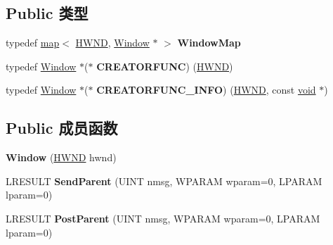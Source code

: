 \subsection*{Public 类型}
\begin{DoxyCompactItemize}
\item 
\mbox{\label{struct_window_a9efa6dd6887b5f902f17591bf0cfce15}} 
typedef \hyperlink{classmap}{map}$<$ \hyperlink{interfacevoid}{H\+W\+ND}, \hyperlink{struct_window}{Window} $\ast$ $>$ {\bfseries Window\+Map}
\item 
\mbox{\label{struct_window_a04b874d3421d316e0fa48deb09ecc94a}} 
typedef \hyperlink{struct_window}{Window} $\ast$($\ast$ {\bfseries C\+R\+E\+A\+T\+O\+R\+F\+U\+NC}) (\hyperlink{interfacevoid}{H\+W\+ND})
\item 
\mbox{\label{struct_window_aa203164dfe6dbac6e3d54d9ffe846a48}} 
typedef \hyperlink{struct_window}{Window} $\ast$($\ast$ {\bfseries C\+R\+E\+A\+T\+O\+R\+F\+U\+N\+C\+\_\+\+I\+N\+FO}) (\hyperlink{interfacevoid}{H\+W\+ND}, const \hyperlink{interfacevoid}{void} $\ast$)
\end{DoxyCompactItemize}
\subsection*{Public 成员函数}
\begin{DoxyCompactItemize}
\item 
\mbox{\label{struct_window_a1d0deff56ec3614cf407850a3f7c5d0b}} 
{\bfseries Window} (\hyperlink{interfacevoid}{H\+W\+ND} hwnd)
\item 
\mbox{\label{struct_window_a5e39dde6ab6cce5ad39538d37f21a732}} 
L\+R\+E\+S\+U\+LT {\bfseries Send\+Parent} (U\+I\+NT nmsg, W\+P\+A\+R\+AM wparam=0, L\+P\+A\+R\+AM lparam=0)
\item 
\mbox{\label{struct_window_ad74ef7b96e174295b29152c345f4e489}} 
L\+R\+E\+S\+U\+LT {\bfseries Post\+Parent} (U\+I\+NT nmsg, W\+P\+A\+R\+AM wparam=0, L\+P\+A\+R\+AM lparam=0)
\end{DoxyCompactItemize}
